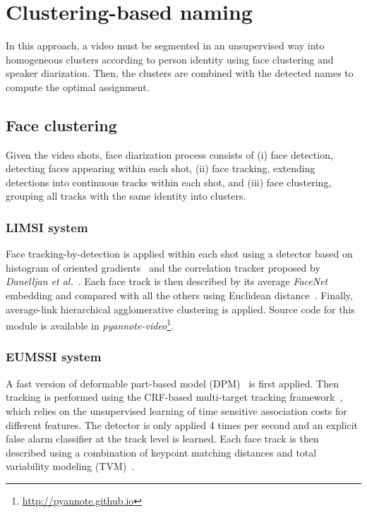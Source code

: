 \section{Clustering-based naming}
\label{sec:clustering}

In this approach, a video must be segmented in an unsupervised way into homogeneous clusters according to person identity using face clustering and speaker diarization. Then, the clusters are combined with the detected names to compute the optimal assignment.

\subsection{Face clustering}

Given the video shots, face diarization process consists of (i) face detection, detecting faces appearing within each shot, (ii) face tracking, extending detections into continuous tracks within each shot, and (iii) face clustering, grouping all tracks with the same identity into clusters.

\subsubsection{LIMSI system}

Face tracking-by-detection is applied within each shot using a detector based on histogram of oriented gradients~\cite{Dalal2005} and the correlation tracker proposed by \emph{Danelljan et al.}~\cite{Danelljan2014}. 
%
Each face track is then described by its average \emph{FaceNet} embedding and compared with all the others using Euclidean distance~\cite{Schroff2015}. 
%
Finally, average-link hierarchical agglomerative clustering is applied. Source code for this module is available in \emph{pyannote-video}\footnote{\url{http://pyannote.github.io}}.

\subsubsection{EUMSSI system}

A fast version of deformable part-based model (DPM)~\cite{felzenszwalb2010dpm,dubout2013deformable} is first applied. Then tracking is performed using the CRF-based multi-target tracking framework~\cite{heili2014tracking}, which relies on the unsupervised learning of time sensitive association costs for different features.
%
The detector is only applied 4 times per second and an explicit false alarm classifier at the track level is learned\cite{Le_ICPR_2016}.
%
Each face track is then described using a combination of keypoint matching distances and total variability modeling (TVM)~\cite{wallace2012total,Khoury:ICMR:2013}.

